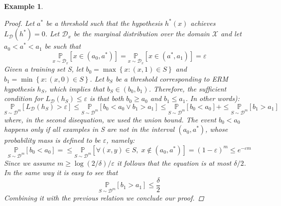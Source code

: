\documentclass[12pt]{report}
\theoremstyle{plain}
\newtheorem{EX}{Example}
\newcommand\mcl[1]{\mathcal{#1}}
\begin{document}
\begin{flushleft}
\begin{EX}
	\begin{proof}
		Let $a^*$ be a threshold such that the hypothesis $h^*(x)$ achieves $L_\mcl{D}(h^*)=0$. Let $\mcl{D}_x$ be the marginal distribution over the domain $\mcl{X}$ and let $a_0 < a^* < a_1$ be such that
		\[ \underset{x\sim\mcl{D}_x}{\mathds{P}}\left[x\in(a_0,a^*)\right]= \underset{x\sim\mcl{D}_x}{\mathds{P}}\left[x\in(a^*,a_1)\right]=\varepsilon \]
		Given a training set S, let $b_0=\max\left\{x:(x,1)\in S\right\}$ and $b_1=\min\left\{x:(x,0)\in S\right\}$. Let $b_S$ be a threshold corresponding to ERM hypothesis $h_S$, which implies that $b_S\in(b_0,b_1)$. Therefore, the sufficient condition for $L_\mcl{D}(h_S)\leq\varepsilon$ is that both $b_0\geq a_0$ and $b_1\leq a_1$. In other words):
		\[ \underset{S\sim\mcl{D}^m}{\mathds{P}}\left[L_\mcl{D}(h_S)>\varepsilon\right]\leq \underset{S\sim\mcl{D}^m}{\mathds{P}}\left[b_0<a_0\vee b_1>a_1 \right] \leq\underset{S\sim\mcl{D}^m}{\mathds{P}}\left[b_0<a_0\right]+\leq\underset{S\sim\mcl{D}^m}{\mathds{P}}\left[b_1>a_1\right] \]
		where, in the second disequation, we used the union bound. 
		The event $b_0<a_0$ happens only if all examples in S are not in the interval $(a_0,a^*)$, whose probability mass is defined to be $\varepsilon$, namely:
		\[ \underset{S\sim\mcl{D}^m}{\mathds{P}}\left[b_0<a_0\right]=\leq\underset{S\sim\mcl{D}^m}{\mathds{P}}\left[\forall (x,y)\in S,\; x\notin(a_0,a^*)\right] = (1-\varepsilon)^m \leq e^{-\varepsilon m} \]
		Since we assume $m\geq \log(2/\delta)/\varepsilon$ it follows that the equation is at most $\delta/2$. In the same way it is easy to see that 
		\[ \underset{S\sim\mcl{D}^m}{\mathds{P}}\left[b_1>a_1\right]\leq \frac{\delta}{2} \]
		Combining it with the previous relation we conclude our proof.	
	\end{proof}
\end{EX}
\vspace{0.5cm}


\end{flushleft}
\end{document}
